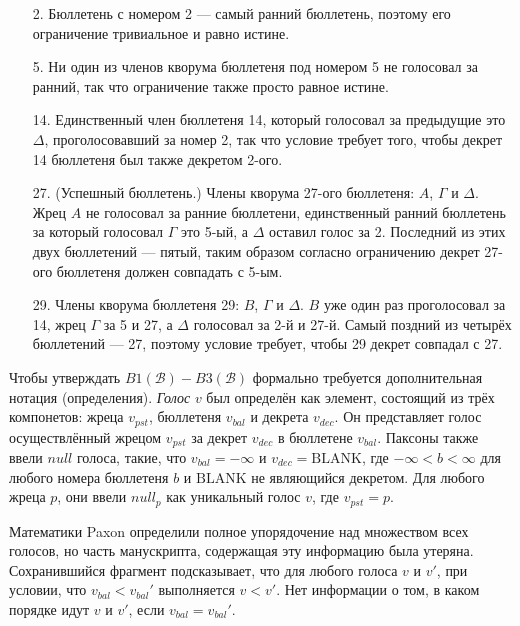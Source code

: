 \documentclass[12pt, a4paper]{article} %
\begin{document}

\begin{itemize}
    \item[2.] Бюллетень с номером 2 --- самый ранний бюллетень, поэтому его ограничение тривиальное и равно истине.
    \item[5.] Ни один из членов кворума бюллетеня под номером 5 не голосовал за ранний, так что ограничение также просто равное истине.
    \item[14.] Единственный член бюллетеня 14, который голосовал за предыдущие это $\Delta$, проголосовавший за номер 2, так что условие требует того, чтобы декрет 14 бюллетеня был также декретом 2-ого.
    \item[27.] (Успешный бюллетень.) Члены кворума 27-ого бюллетеня: $A$, $\Gamma$ и $\Delta$. Жрец $A$ не голосовал за ранние бюллетени, единственный ранний бюллетень за который голосовал $\Gamma$ это 5-ый, а $\Delta$ оставил голос за 2. Последний из этих двух бюллетений --- пятый, таким образом согласно ограничению декрет 27-ого бюллетеня должен совпадать с 5-ым.
    \item[29.] Члены кворума бюллетеня 29: $B$, $\Gamma$ и $\Delta$. $B$ уже один раз проголосовал за 14, жрец $\Gamma$ за 5 и 27, а $\Delta$ голосовал за 2-й и 27-й. Самый поздний из четырёх бюллетений --- 27, поэтому условие требует, чтобы 29 декрет совпадал с 27.
\end{itemize}


Чтобы утверждать $B1(\mathcal{B}) - B3(\mathcal{B})$ формально требуется дополнительная нотация (определения). \textit{Голос} $v$ был определён как элемент, состоящий из трёх компонетов: жреца $v_{pst}$, бюллетеня $v_{bal}$ и декрета $v_{dec}$. Он представляет голос осуществлённый жрецом $v_{pst}$ за декрет $v_{dec}$ в бюллетене $v_{bal}$. Паксоны также ввели $null$ голоса, такие, что $v_{bal}=-\infty$ и $v_{dec}=\mathrm{BLANK}$, где $-\infty < b < \infty$ для любого номера бюллетеня $b$ и $\mathrm{BLANK}$ не являющийся декретом. Для любого жреца $p$, они ввели $null_p$ как уникальный голос $v$, где $v_{pst}=p$.

Математики Paxon определили полное упорядочение над множеством всех голосов, но часть манускрипта, содержащая эту информацию была утеряна. Сохранившийся фрагмент подсказывает, что для любого голоса $v$ и $v'$, при условии, что $v_{bal} < v_{bal}'$ выполняется $v < v'$. Нет информации о том, в каком порядке идут $v$ и $v'$, если $v_{bal} = v_{bal}'$.
\end{document}
